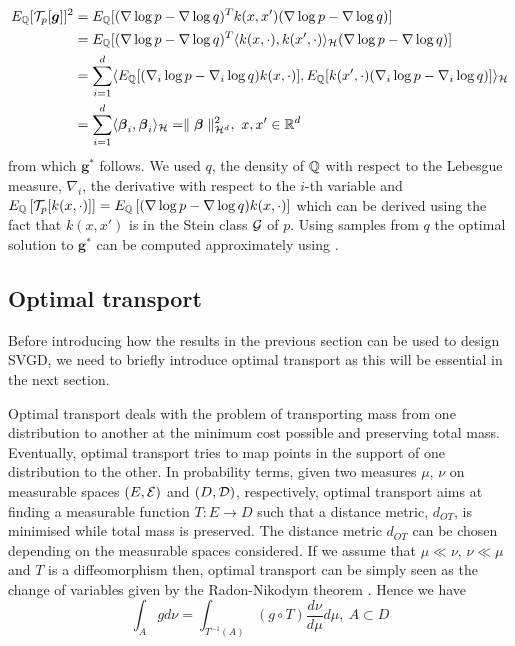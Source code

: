 \begin{equation*}
	\begin{split}
E_{\bbQ}[\calT_p[\boldsymbol{g}]]^2 &= E_{\bbQ}[(\nabla \log p - \nabla \log q)^T k(x, x') (\nabla \log p - \nabla \log q)] \\
&=  E_{\bbQ}[(\nabla \log p - \nabla \log q)^T \langle k(x, \cdot), k(x', \cdot) \rangle_{\calH} (\nabla \log p - \nabla \log q)] \\
&= \sum_{i=1}^d \langle E_{\bbQ}[(\nabla_i \log p - \nabla_i \log q) k(x, \cdot)], E_{\bbQ}[ k(x', \cdot) (\nabla_i \log p - \nabla_i \log q)]  \rangle_{\calH} \\
&= \sum_{i=1}^d \langle \boldsymbol{\beta}_i, \boldsymbol{\beta}_i \rangle_{\calH} = \parallel \boldsymbol{\beta}\parallel^2_{\calH^d}, \ x,x' \in \bbR^d
	\end{split}
\end{equation*}
from which $\boldsymbol{g}^*$ follows. We used $q$, the density of $\mathbb{Q}$ with respect to the Lebesgue measure, $\nabla_i$, the derivative with respect to the $i$-th variable and $E_{\mathbb{Q}}\left[\mathcal{T}_p[k(x, \cdot)]\right] = E_{\mathbb{Q}}\left[(\nabla \log p - \nabla \log q)k(x, \cdot)\right] $ which can be derived using the fact that $k(x, x')$ is in the Stein class $\mathcal{G}$ of $p$. Using samples from $q$ the optimal solution to $\boldsymbol{g}^*$ can be computed approximately using . 

\subsection{Optimal transport}\label{OT}
Before introducing how the results in the previous section can be used to design SVGD, we need to briefly introduce optimal transport as this will be essential in the next section.

Optimal transport deals with the problem of transporting mass from one distribution to another at the minimum cost possible and preserving total mass. Eventually, optimal transport tries to map points in the support of one distribution to the other. In probability terms, given two measures $\mu$, $\nu$ on measurable spaces $(E, \mathcal{E})$ and $(D, \mathcal{D})$, respectively, optimal transport aims at finding a measurable function $T: E \rightarrow D$ such that a distance metric, $d_{OT}$, is minimised while total mass is preserved. The distance metric $d_{OT}$ can be chosen depending on the measurable spaces considered. If we assume that $\mu \ll \nu$, $\nu \ll \mu$ and $T$ is a diffeomorphism then, optimal transport can be simply seen as the change of variables given by the Radon-Nikodym theorem \cite{peyre2019computational}. Hence we have
\begin{equation}\label{OT_density}
\int_A gd\nu = \int_{T^{-1}(A)} (g \circ T) \frac{d\nu}{d\mu}d\mu, \ A \subset D
\end{equation}

